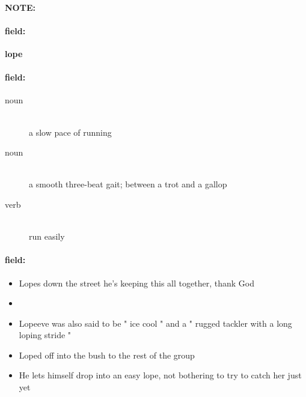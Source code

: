 \documentclass[12pt]{article}
\newenvironment{note}{\paragraph{NOTE:}}{}
\newenvironment{field}{\paragraph{field:}}{}
\begin{document}
\begin{note}
\begin{field}
\textbf{\large lope}
\end{field}


\begin{field}
\begin{description}
\item[noun] \hfill \\ 
a slow pace of running

\item[noun] \hfill \\ 
a smooth three-beat gait; between a trot and a gallop

\item[verb] \hfill \\ 
run easily

\end{description}
\end{field}

\begin{field}
\begin{itemize}
\item Lopes down the street he's keeping this all together, thank God
\item 
\item Lopeeve was also said to be " ice cool " and a " rugged tackler with a long loping stride " 
\item Loped off into the bush to the rest of the group
\item He lets himself drop into an easy lope, not bothering to try to catch her just yet
\end{itemize}
\end{field}
\end{note}
\end{document}
